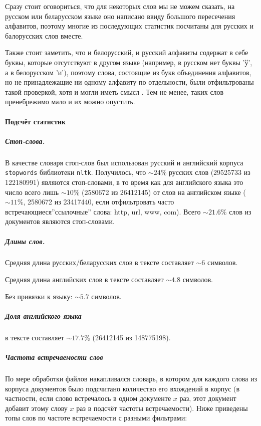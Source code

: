 Сразу стоит оговориться, что для некоторых слов мы не можем сказать, на русском или беларусском языке оно написано ввиду большого пересечения алфавитов, поэтому многие из последующих статистик посчитаны для русских и балорусских слов вместе.

Также стоит заметить, что и белорусский, и русский алфавиты содержат в себе буквы, которые отсутствуют в другом языке (например, в русском нет буквы 'ў', а в белорусском 'и'), поэтому слова, состоящие из букв объединения алфавитов, но не принадлежащие ни одному алфавиту по отдельности, были отфильтрованы такой проверкой, хотя и могли иметь смысл . Тем не менее, таких слов пренебрежимо мало и их можно опустить.


\paragraph{Подсчёт статистик}

\subparagraph{Стоп-слова.}

В качестве словаря стоп-слов был использован русский и английский корпуса \texttt{stopwords} библиотеки \texttt{nltk}. Получилось, что $\sim24\%$ русских слов (29525733 из 122180991) являются стоп-словами, в то время как для английского языка это число всего лишь $\sim10\%$ (2580672 из 26412145) от слов на английском языке ($\sim11\%$, 2580672 из 23417440, если отфильтровать часто встречающиеся''ссылочные'' слова: http, url, www, com). Всего $\sim 21.6\%$ слов из документов являются стоп-словами. 

\subparagraph{Длины слов.}

Средняя длина русских/беларусских слов в тексте составляет $\sim 6$ символов.

Средняя длина английских слов в тексте составляет $\sim 4.8$ символов.

Без привязки к языку: $\sim 5.7$ символов.


\subparagraph{Доля английского языка} в тексте составляет $\sim 17.7\%$ (26412145 из 148775198).

\subparagraph{Частота встречаемости слов}

По мере обработки файлов накапливался словарь, в котором для каждого слова из корпуса документов было подсчитано количество его вхождений в корпус (в частности, если слово встречалось в одном документе $x$ раз, этот документ добавит этому слову $x$ раз в подсчёт частоты встречаемости). Ниже приведены топы слов по частоте встречаемости с разными фильтрами: 

